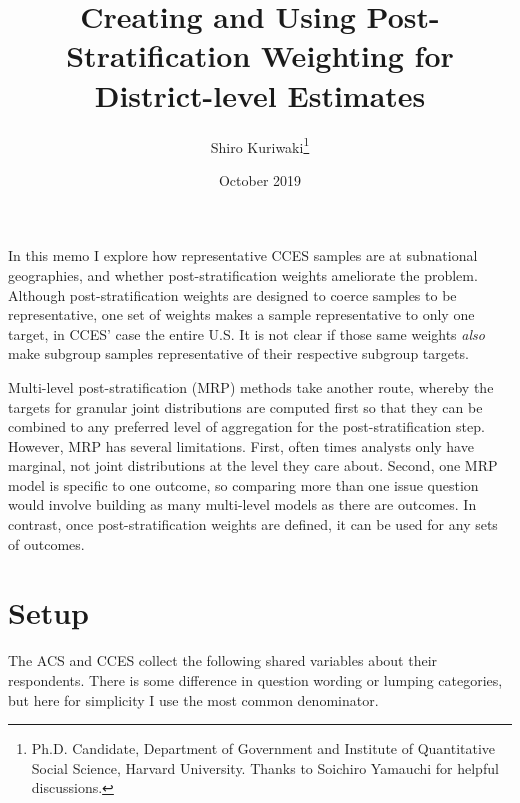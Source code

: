 \documentclass[11pt]{article}
\title{\large\textbf{Creating and Using Post-Stratification Weighting for District-level Estimates}}
\author{\normalsize  Shiro Kuriwaki\thanks{Ph.D. Candidate, Department of Government and Institute of Quantitative Social Science, Harvard University. Thanks to Soichiro Yamauchi for helpful discussions.}}
\date{\normalsize October 2019}
\begin{document}
\maketitle

\onehalfspacing

In this memo I explore how representative CCES samples are at subnational geographies, and whether post-stratification weights ameliorate the problem. Although post-stratification weights are designed to coerce samples to be representative, one set of weights makes a sample representative to only one target, in CCES' case the entire U.S. It is not clear if those same weights \emph{also} make subgroup samples representative of their respective subgroup targets. 

Multi-level post-stratification (MRP) methods take another route, whereby the targets for granular joint distributions are computed first so that they can be combined to any preferred level of aggregation for the post-stratification step. However, MRP has several limitations. First, often times analysts only have marginal, not joint distributions at the level they care about. Second, one MRP model is specific to one outcome, so comparing more than one issue question would involve building as many multi-level models as there are outcomes. In contrast, once post-stratification weights are defined, it can be used for any sets of outcomes. 

\section*{Setup}

The ACS and CCES collect the following shared variables about their respondents. There is some difference in question wording or lumping categories, but here for simplicity I use the most common denominator.

\end{document}
